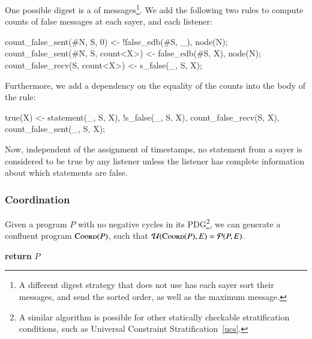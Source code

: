 
One possible digest is a  of  messages\footnote{A different digest strategy that does not use  has each sayer sort their messages, and send the sorted order, as well as the maximum message.}.  We add the following two rules to compute counts of false messages at each sayer, and each listener:

\begin{Dedalus}
count_false_sent(#N, S, 0) <- 
  !false_edb(#S, _), node(N);
count_false_sent(#N, S, count<X>) <- 
  false_edb(#S, X), node(N);
count_false_recv(S, count<X>) <- s_false(_, S, X);
\end{Dedalus}

Furthermore, we add a dependency on the equality of the counts into the body of the  rule:

\begin{Dedalus}
true(X) <- statement(_, S, X), !s_false(_, S, X),
           count_false_recv(S, X),
           count_false_sent(_, S, X);
\end{Dedalus}

Now, independent of the assignment of timestamps, no statement from a sayer  is considered to be true by any listener unless the listener has complete information about which statements are false.

\subsubsection{Coordination}
\label{sec:coord}
Given a \lang program $P$ with no negative cycles in its PDG\footnote{A similar algorithm is possible for other statically checkable stratification conditions, such as Universal Constraint Stratification~\ref{ucs}.}, we can generate a confluent program $\textsc{Coord}(P)$, such that \linebreak $\mathcal{U}(\textsc{Coord}(P), E) = \mathcal{P}(P, E)$.

\begin{algorithmic}[1]
  \EndFor
   \label{alg:addrules} %
   \label{alg:lastfor}
  \EndFor
  \EndFor%
  \State \textbf{return} $P$
  \EndProcedure
\end{algorithmic}


